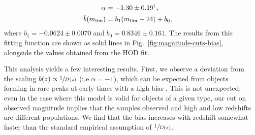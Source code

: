 \documentclass[a4paper,11pt]{article}
\begin{document}
    \begin{equation}
      \begin{aligned}
        \alpha &= -1.30 \pm 0.19\footnotemark,\\
        \bar{b}(m_{\mathrm{lim}}) &= b_{1}(m_{\mathrm{lim}}-24) + b_{0},
        \label{eq:bias-fit-func-result}
      \end{aligned}
    \end{equation}
    where $b_{1} = -0.0624 \pm 0.0070$ and $b_{0} = 0.8346 \pm 0.161$. The results from this fitting function are shown as solid lines in Fig.~\ref{fig:magnitude-cuts-bias}, alongside the values obtained from the HOD fit.

    This analysis yields a few interesting results. First, we observe a deviation from the scaling $b(z) \propto \sfrac{1}{D(z)}$ (i.e $\alpha=-1$), which can be expected from objects forming in rare peaks at early times with a high bias \cite{1986ApJ...304...15B,1996MNRAS.282..347M,1998ApJ...500L..79T,Coil:2004}. This is not unexpected: even in the case where this model is valid for objects of a given type, our cut on observed magnitude implies that the samples observed and high and low redshifts are different populations. We find that the bias increases with redshift somewhat faster than the standard empirical assumption of $\sfrac{1}{D(z)}$.
\end{document}
